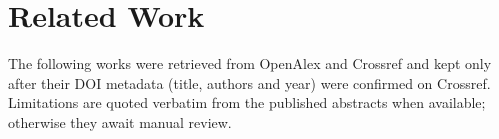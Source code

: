 \chapter{Related Work}
\label{chap:related}

The following works were retrieved from OpenAlex and Crossref and kept only after their DOI
metadata (title, authors and year) were confirmed on Crossref. Limitations are quoted verbatim from
the published abstracts when available; otherwise they await manual review.


